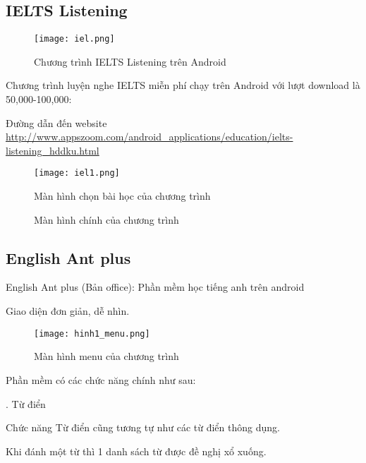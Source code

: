 \subsection{IELTS Listening}

\begin{figure}[!htb] 
\centering
\texttt{[image: iel.png]}
\caption{Chương trình IELTS Listening trên Android}
\end{figure}

Chương trình luyện nghe IELTS miễn phí chạy trên Android với lượt download là 50,000-100,000:

Đường dẫn đến website \url{http://www.appszoom.com/android_applications/education/ielts-listening_hddku.html}

\begin{figure}[!htb] 
\centering
\texttt{[image: iel1.png]}

\caption{Màn hình chọn bài học của chương trình}
\end{figure}

\begin{figure}[!h] 
\centering
{}

\caption{Màn hình chính của chương trình }
\end{figure}




\subsection{English Ant plus}

English Ant plus (Bản office): Phần mềm học tiếng anh trên android

Giao diện đơn giản, dễ nhìn.

\begin{figure}[!htb] 
\centering
\texttt{[image: hinh1\_menu.png]}
\caption{Màn hình menu của chương trình}
\end{figure}

Phần mềm có các chức năng chính như sau:

. Từ điển

Chức năng Từ điển cũng tương tự như các từ điển thông dụng.


Khi đánh một từ thì 1 danh sách từ được đề nghị xổ xuống.

